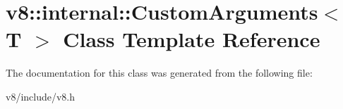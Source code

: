 \hypertarget{classv8_1_1internal_1_1CustomArguments}{}\section{v8\+:\+:internal\+:\+:Custom\+Arguments$<$ T $>$ Class Template Reference}
\label{classv8_1_1internal_1_1CustomArguments}


The documentation for this class was generated from the following file\+:\begin{DoxyCompactItemize}
\item 
v8/include/v8.\+h\end{DoxyCompactItemize}
